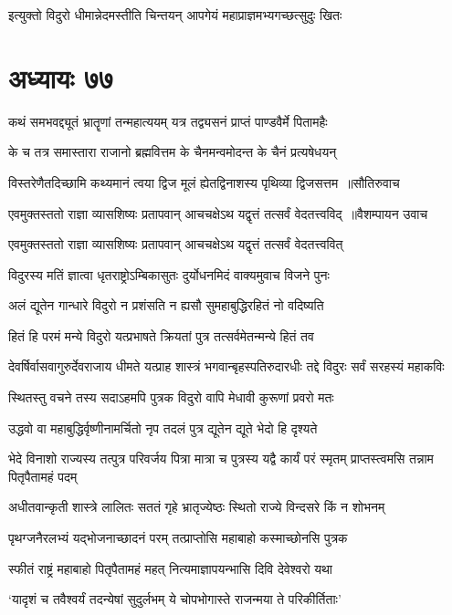 \twolineshloka
{इत्युक्तो विदुरो धीमान्नेदमस्तीति चिन्तयन्}
{आपगेयं महाप्राज्ञमभ्यगच्छत्सुदुः खितः}


\chapter{अध्यायः ७७}
\twolineshloka
{कथं समभवद्द्यूतं भ्रातॄणां तन्महात्ययम्}
{यत्र तद्व्यसनं प्राप्तं पाण्डवैर्मे पितामहैः}


\twolineshloka
{के च तत्र समास्तारा राजानो ब्रह्मवित्तम}
{के चैनमन्वमोदन्त के चैनं प्रत्यषेधयन्}


\threelineshloka
{विस्तरेणैतदिच्छामि कथ्यमानं त्वया द्विज}
{मूलं ह्येतद्विनाशस्य पृथिव्या द्विजसत्तम ॥सौतिरुवाच}
{}


\twolineshloka
{एवमुक्तस्ततो राज्ञा व्यासशिष्यः प्रतापवान्}
{आचचक्षेऽथ यद्वृत्तं तत्सर्वं वेदतत्त्वविद् ॥वैशम्पायन उवाच}


\twolineshloka
{एवमुक्तस्ततो राज्ञा व्यासशिष्यः प्रतापवान्}
{आचचक्षेऽथ यद्वृत्तं तत्सर्वं वेदतत्त्ववित्}


\twolineshloka
{विदुरस्य मतिं ज्ञात्वा धृतराष्ट्रोऽम्बिकासुतः}
{दुर्योधनमिदं वाक्यमुवाच विजने पुनः}


\twolineshloka
{अलं द्यूतेन गान्धारे विदुरो न प्रशंसति}
{न ह्यसौ सुमहाबुद्धिरहितं नो वदिष्यति}


\twolineshloka
{हितं हि परमं मन्ये विदुरो यत्प्रभाषते}
{क्रियतां पुत्र तत्सर्वमेतन्मन्ये हितं तव}


\threelineshloka
{देवर्षिर्वासवागुरुर्देवराजाय धीमते}
{यत्प्राह शास्त्रं भगवान्बृहस्पतिरुदारधीः}
{तद्दे विदुरः सर्वं सरहस्यं महाकविः}


\twolineshloka
{स्थितस्तु वचने तस्य सदाऽहमपि पुत्रक}
{विदुरो वापि मेधावी कुरूणां प्रवरो मतः}


\twolineshloka
{उद्धवो वा महाबुद्धिर्वृष्णीनामर्चितो नृप}
{तदलं पुत्र द्यूतेन द्यूते भेदो हि दृश्यते}


भेदे विनाशो राज्यस्य तत्पुत्र परिवर्जय
\twolineshloka
{पित्रा मात्रा च पुत्रस्य यद्वै कार्यं परं स्मृतम्}
{प्राप्तस्त्वमसि तन्नाम पितृपैतामहं पदम्}


\twolineshloka
{अधीतवान्कृती शास्त्रे लालितः सततं गृहे}
{भ्रातृज्येष्ठः स्थितो राज्ये विन्दसरे किं न शोभनम्}


\twolineshloka
{पृथग्जनैरलभ्यं यद्भोजनाच्छादनं परम्}
{तत्प्राप्तोसि महाबाहो कस्माच्छोनसि पुत्रक}


\twolineshloka
{स्फीतं राष्ट्रं महाबाहो पितृपैतामहं महत्}
{नित्यमाज्ञापयन्भासि दिवि देवेश्वरो यथा}


\twolineshloka
{`यादृशं च तवैश्वर्यं तदन्येषां सुदुर्लभम्}
{ये चोपभोगास्ते राजन्मया ते परिकीर्तिताः'}


